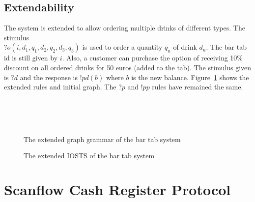 \subsection{Extendability}
The system is extended to allow ordering multiple drinks of different types. The stimulus \\$?o(i,d_1,q_1,d_2,q_2,d_3,q_3)$ is used to order a quantity $q_n$ of drink $d_n$. The bar tab id is still given by $i$. Also, a customer can purchase the option of receiving 10\% discount on all ordered drinks for 50 euros (added to the tab). The stimulus given is $?\mathit{d}$ and the response is $!pd(b)$ where $b$ is the new balance. Figure~\ref{fig:gg-bartab-extended} shows the extended rules and initial graph. The $?p$ and $!pp$ rules have remained the same.

\begin{figure}[ht]
  \begin{center}
    \hspace{20px}
    \\
    \hspace{20px}
    \\
    \\
  \end{center}
  \caption{The extended graph grammar of the bar tab system}
  \label{fig:gg-bartab-extended}
\end{figure}

\begin{figure}[ht]
  \begin{center}
    
  \end{center}
  \caption{The extended IOSTS of the bar tab system}
  \label{fig:sts-bartab-extended}
\end{figure}

\section{Scanflow Cash Register Protocol}

